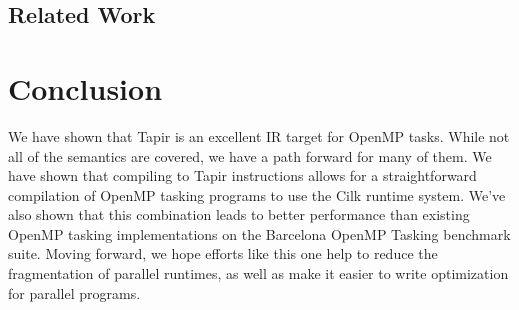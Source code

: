 \documentclass[sigconf]{acmart}
\begin{document}
\subsection{Related Work} \label{Sec:Related}

\section{Conclusion} \label{Sec:Conclusion}
We have shown that Tapir is an excellent IR target for OpenMP tasks. While not
all of the semantics are covered, we have a path forward for many of them. We have
shown that compiling to Tapir instructions allows for a straightforward compilation of 
OpenMP tasking programs to use the Cilk runtime system. We've also shown that this
combination leads to better performance than existing OpenMP tasking implementations
on the Barcelona OpenMP Tasking benchmark suite. Moving forward, we hope efforts like
this one help to reduce the fragmentation of parallel runtimes, as well as make
it easier to write optimization for parallel programs. 



\end{document}
